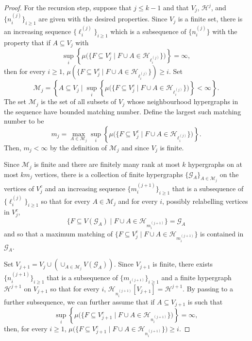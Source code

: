 \documentclass[11pt,reqno]{amsart}
\theoremstyle{definition}
\begin{document}
\begin{proof}
For the recursion step, suppose that $j \leq k-1$ and that $V_j$, $\mathcal{H}^j$, and $\{n_i^{(j)}\}_{i \geq 1}$ are given with the desired properties. Since $V_j$ is a finite set, there is an increasing sequence $\{{\ell}_i^{(j)}\}_{i \geq 1}$ which is a subsequence of $\{n_i^{(j)}\}$ with the property that if $A \subseteq V_j$ with
\[
 \sup_i \left\{\mu\big(\{F \subseteq V_j^c \mid F \cup A \in \mathcal{H}_{\ell_i^{(j)}}\}\big)\right\} = \infty,
\]
then for every $i \geq 1$, $\mu(\{F \subseteq V_j^c \mid F \cup A \in \mathcal{H}_{\ell_i^{(j)}}\}) \geq i$. Set
\[
 \mathcal{M}_j =\left\{A \subseteq V_j \mid \sup_i \left\{ \mu\big(\{F \subseteq V_j^c \mid F\cup A \in \mathcal{H}_{\ell_i^{(j)}}\}\big)\right\} < \infty \right\}.
\]
The set $\mathcal{M}_j$ is the set of all subsets of $V_j$ whose neighbourhood hypergraphs in the sequence have bounded matching number. Define the largest such matching number to be
\[
 m_j = \max_{A \in \mathcal{M}_j} \sup_i \left\{ \mu\big(\{F \subseteq V_j^c \mid F\cup A \in \mathcal{H}_{\ell_i^{(j)}}\}\big)\right\}.
\]
Then, $m_j < \infty$ by the definition of $\mathcal{M}_j$ and since $V_j$ is finite.

Since $\mathcal{M}_j$ is finite and there are finitely many rank at most $k$ hypergraphs on at most $k m_j$ vertices, there is a collection of finite hypergraphs $\{\mathcal{G}_A\}_{A \in \mathcal{M}_j}$ on the vertices of $V_j^c$ and an increasing sequence $\{m_i^{(j+1)}\}_{i \geq 1}$ that is a subsequence of $\{\ell_i^{(j)}\}_{i \geq 1}$ so that for every $A \in \mathcal{M}_j$ and for every $i$, possibly relabelling vertices in $V_j^c$,
\[
 \{F \subseteq V(\mathcal{G}_A) \mid F \cup A \in \mathcal{H}_{m_i^{(j+1)}}\} = \mathcal{G}_A
\]
and so that a maximum matching of $\{F \subseteq V_j^c \mid F \cup A \in \mathcal{H}_{m_i^{(j+1)}}\}$ is contained in~$\mathcal{G}_A$.

Set $V_{j+1} = V_j \cup \left( \cup_{A \in \mathcal{M}_j} V(\mathcal{G}_A) \right)$. Since $V_{j+1}$ is finite, there exists $\{n_i^{(j+1)}\}_{i \geq 1}$ that is a subsequence of $\{m_{i^{(j+1)}}\}_{i \geq 1}$ and a finite hypergraph $\mathcal{H}^{j+1}$ on $V_{j+1}$ so that for every $i$, $\mathcal{H}_{n_i^{(j+1)}}[V_{j+1}] = \mathcal{H}^{j+1}$.  By passing to a further subsequence, we can further assume that if $A \subseteq V_{j+1}$ is such that
\[
 \sup_i \left\{\mu\big(\{F \subseteq V_{j+1}^c \mid F \cup A \in \mathcal{H}_{n_{i}^{(j+1)}}\}\big)\right\} = \infty,
\]
then, for every $i \geq 1$, $\mu\big(\{F \subseteq V_{j+1}^c \mid F \cup A \in \mathcal{H}_{n_{i}^{(j+1)}}\}\big) \geq i$.


\end{proof}
\end{document}
